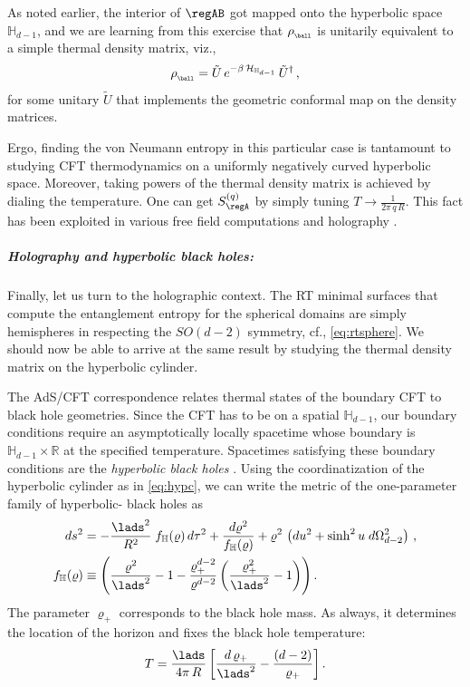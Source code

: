 \documentclass[12pt,openany]{book}
\begin{document}
As noted earlier, the interior of $\regAB$ got mapped onto the hyperbolic space $\mathbb{H}_{d-1}$, and we are learning from this exercise that $\rho_{_{\ball}}$ is unitarily equivalent to a simple thermal density matrix, viz.,
%
\begin{equation}
\rho_{_{\ball}} = \tilde{U} \, e^{-\beta\,  {\cal H}_{\mathbb{H}_{d-1}}}\, \tilde{U}^\dagger\,,
\end{equation}
%
for some unitary $\tilde{U}$ that implements the geometric conformal map on the density matrices.

Ergo, finding the von Neumann entropy in this particular case is tantamount to studying CFT thermodynamics on a uniformly negatively curved hyperbolic space. Moreover,  taking powers of the thermal density matrix is achieved by dialing the temperature. One can get $S^{(q)}_\regA $ by simply tuning $T\to \frac{1}{2\pi\,q\,R}$.
This fact has been exploited in various free field computations \cite{Klebanov:2011uf} and holography \cite{Hung:2011nu}.


\subparagraph{Holography and hyperbolic black holes:} Finally, let us turn to the holographic context. The RT minimal surfaces that compute the entanglement entropy for the spherical domains are simply hemispheres in  respecting the $SO(d-2)$ symmetry, cf., \eqref{eq:rtsphere}. We should now be able to arrive at the same result by studying the thermal density matrix on the hyperbolic cylinder.

The AdS/CFT correspondence relates thermal states of the boundary CFT to black hole geometries. Since the CFT has to be on a spatial $\mathbb{H}_{d-1}$, our boundary conditions require an asymptotically locally  spacetime whose boundary is $\mathbb{H}_{d-1} \times {\mathbb R}$ at the specified temperature.  Spacetimes  satisfying these boundary conditions are the \emph{hyperbolic black holes} \cite{Emparan:1999gf}. Using the coordinatization of the hyperbolic cylinder as in \eqref{eq:hypc},
we can write the metric of the one-parameter family of hyperbolic- black holes as
%
\begin{equation}
\begin{split}
ds^2 &= -\frac{\lads^2}{R^2} \; f_{\mathbb{H}}(\varrho)\, d\tau^2 + \frac{d\varrho^2}{f_{\mathbb{H}}(\varrho)} + \varrho^2 \, \left(du^2 + \sinh^2u\; d\Omega_{d-2}^2\right) \,, \\
f_{\mathbb{H}}(\varrho) &\equiv \left( \frac{\varrho^2}{\lads^2} -1 - \frac{\varrho_+^{d-2}}{ \varrho^{d-2}}\left(\frac{\varrho_+^2}{\lads^2}-1\right)\right) .
\end{split}
\label{eq:hypbhsol}
\end{equation}
%
The parameter $\varrho_+$ corresponds to the black hole mass. As always,  it determines the location of the horizon and fixes the black hole temperature:
%
\begin{equation}
T = \frac{\lads}{4\pi\, R} \left[ \frac{d \, \varrho_+}{\lads^2} - \frac{(d-2)}{\varrho_+} \right] .
\label{eq:Thypbh}
\end{equation}
%
\end{document}
